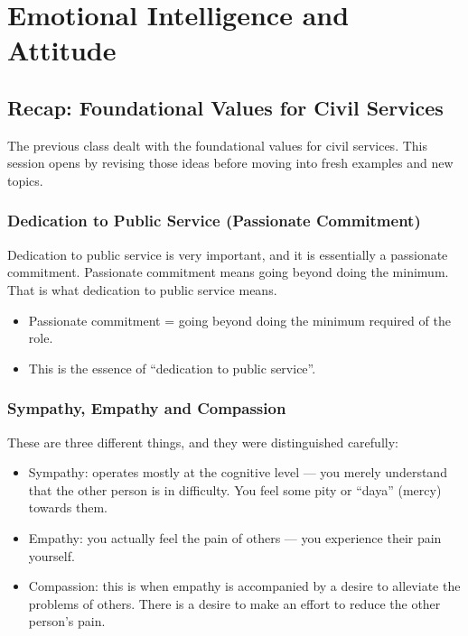 
\chapter{Emotional Intelligence and Attitude}


\vspace{14pt}

\section{Recap: Foundational Values for Civil Services}

The previous class dealt with the foundational values for civil services. This session opens by revising those ideas before moving into fresh examples and new topics.

\subsection{Dedication to Public Service (Passionate Commitment)}

Dedication to public service is very important, and it is essentially a passionate commitment. Passionate commitment means going beyond doing the minimum. That is what dedication to public service means.

\begin{KeyConcept}
\begin{itemize}
\item Passionate commitment = going beyond doing the minimum required of the role.
\item This is the essence of ``dedication to public service''.
\end{itemize}
\end{KeyConcept}

\subsection{Sympathy, Empathy and Compassion}

These are three different things, and they were distinguished carefully:

\begin{itemize}
\item Sympathy: operates mostly at the cognitive level --- you merely understand that the other person is in difficulty. You feel some pity or ``daya'' (mercy) towards them.
\item Empathy: you actually feel the pain of others --- you experience their pain yourself.
\item Compassion: this is when empathy is accompanied by a desire to alleviate the problems of others. There is a desire to make an effort to reduce the other person's pain.
\end{itemize}

